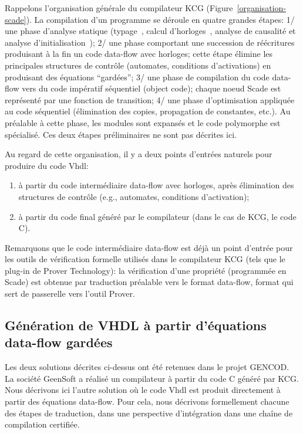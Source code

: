 \documentclass[a4paper]{article}
\newcommand{\scade}{{\sc Scade}}
\newcommand{\vhdl}{{\sc Vhdl}}
\begin{document}
Rappelons l'organisation générale du compilateur KCG
(Figure~\ref{organisation-scade}).  La compilation d'un programme se
déroule en quatre grandes étapes: 1/ une phase d'analyse statique
(typage~\cite{lucy:emsoft03}, calcul d'horloges~\cite{lucy:emsoft04},
analyse de causalité et analyse d'initialisation~\cite{lucy:sttt04});
2/ une phase comportant une succession de réécritures produisant à la
fin un code data-flow avec horloges; cette étape élimine les
principales structures de contrôle (automates, conditions
d'activations) en produisant des équations ``gardées''; 3/ une phase
de compilation du code data-flow vers du code impératif séquentiel
(object code); chaque noeud \scade{} est représenté par une fonction
de transition; 4/ une phase d'optimisation appliquée au code
séquentiel (élimination des copies, propagation de constantes,
etc.). Au préalable à cette phase, les modules sont expansés et le
code polymorphe est spécialisé. Ces deux étapes préliminaires ne sont
pas décrites ici.

Au regard de cette organisation, il y a deux points d'entrées naturels
pour produire du code \vhdl{}:
\begin{enumerate}
\item à partir du code intermédiaire data-flow avec horloges, après
  élimination des structures de contrôle (e.g., automates, conditions
  d'activation);
\item
à partir du code final généré par le compilateur (dans le cas de KCG, le
code C).
\end{enumerate}

Remarquons que le code intermédiaire data-flow est déjà un point d'entrée pour les
outils de vérification formelle utilisés dans le compilateur KCG (tels que
le plug-in de Prover Technology): la vérification d'une propriété (programmée
en \scade) est obtenue par traduction préalable vers le format data-flow,
format qui sert de passerelle vers l'outil Prover.

\subsection{Génération de VHDL à partir d'équations data-flow gardées}
Les deux solutions décrites ci-dessus ont été retenues dans le projet
GENCOD. La société GeenSoft a réalisé un compilateur à partir du code
C généré par KCG. Nous décrivons ici l'autre solution où le code
\vhdl{} est produit directement à partir des équations data-flow. Pour cela,
nous décrivons formellement chacune des étapes de traduction, dans une
perspective d'intégration dans une chaîne de compilation certifiée.
\end{document}
